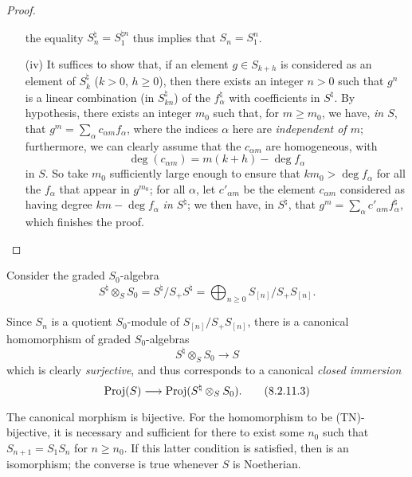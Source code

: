 \begin{proof}
\begin{enumerate}
    the equality $S_n^\natural=S_1^{\natural n}$ thus implies that $S_n=S_1^n$.
  \item[\rm{(iv)}] It suffices to show that, if an element $g\in S_{k+h}$ is considered as an element of $S_k^\natural$ ($k>0$, $h\geq0$), then there exists an integer $n>0$ such that $g^n$ is a linear combination (in $S_{kn}^\natural$) of the $f_\alpha^\natural$ with coefficients in $S^\natural$.
    By hypothesis, there exists an integer $m_0$ such that, for $m\geq m_0$, we have, \emph{in $S$}, that $g^m = \sum_\alpha c_{\alpha m}f_\alpha$, where the indices $\alpha$ here are \emph{independent of $m$};
    furthermore, we can clearly assume that the $c_{\alpha m}$ are homogeneous, with
    \[
      \deg(c_{\alpha m}) = m(k+h)-\deg f_\alpha
    \]
    in $S$.
    So take $m_0$ sufficiently large enough to ensure that $km_0>\deg f_\alpha$ for all the $f_\alpha$ that appear in $g^{m_0}$;
    for all $\alpha$, let $c'_{\alpha m}$ be the element $c_{\alpha m}$ considered as having degree $km-\deg f_\alpha$ \emph{in $S^\natural$};
    we then have, in $S^\natural$, that $g^m = \sum_\alpha c'_{\alpha m}f_\alpha^\natural$, which finishes the proof.
\end{enumerate}
\end{proof}

\begin{env}[8.2.11]
\label{2.8.2.11}
Consider the graded $S_0$-algebra
\[
\label{eq:2.8.2.11.1}
  S^\natural \otimes_S S_0
  =
  S^\natural/S_+S^\natural
  =
  \bigoplus_{n\geq0} S_{[n]}/S_+S_{[n]}.
\tag{8.2.11.1}
\]

Since $S_n$ is a quotient $S_0$-module of $S_{[n]}/S_+S_{[n]}$, there is a canonical homomorphism of graded $S_0$-algebras
\[
\label{eq:2.8.2.11.2}
  S^\natural \otimes_S S_0 \to S
\tag{8.2.11.2}
\]
which is clearly \emph{surjective}, and thus corresponds  to a canonical \emph{closed immersion}
\[
\label{eq:2.8.2.11.3}
  \Proj(S) \to \Proj(S^\natural \otimes_S S_0).
\tag{8.2.11.3}
\]
\end{env}

\begin{proposition}[8.2.12]
\label{2.8.2.12}
The canonical morphism  is bijective.
For the homomorphism  to be (TN)-bijective, it is necessary and sufficient for there to exist some $n_0$ such that $S_{n+1}=S_1S_n$ for $n\geq n_0$.
If this latter condition is satisfied, then  is an isomorphism;
the converse is true whenever $S$ is Noetherian.
\end{proposition}

